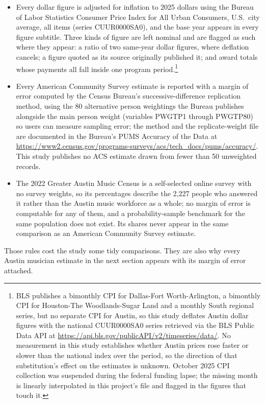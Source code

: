 \begin{itemize}
\item Every dollar figure is adjusted for inflation to 2025 dollars using the
      Bureau of Labor Statistics Consumer Price Index for All Urban Consumers,
      U.S.\ city average, all items (series CUUR0000SA0), and the base year
      appears in every figure subtitle. Three kinds of figure are left nominal
      and are flagged as such where they appear: a ratio of two same-year
      dollar figures, where deflation cancels; a figure quoted as its source
      originally published it; and award totals whose payments all fall inside
      one program period.\footnote{BLS publishes a bimonthly CPI for
      Dallas-Fort Worth-Arlington, a bimonthly CPI for Houston-The Woodlands-Sugar
      Land and a monthly South regional series, but no separate CPI for Austin,
      so this study deflates Austin dollar figures with the national CUUR0000SA0
      series retrieved via the BLS Public Data API at
      \url{https://api.bls.gov/publicAPI/v2/timeseries/data/}. No measurement
      in this study establishes whether Austin prices rose faster or slower
      than the national index over the period, so the direction of that
      substitution's effect on the estimates is unknown. October 2025 CPI
      collection was suspended during the federal funding lapse; the missing
      month is linearly interpolated in this project's file and flagged in the
      figures that touch it.}
\item Every American Community Survey estimate is reported with a margin of
      error computed by the Census Bureau's successive-difference replication
      method, using the 80 alternative person weightings the Bureau publishes
      alongside the main person weight (variables PWGTP1 through PWGTP80) so
      users can measure sampling error; the method and the replicate-weight
      file are documented in the Bureau's PUMS Accuracy of the Data at
      \url{https://www2.census.gov/programs-surveys/acs/tech_docs/pums/accuracy/}.
      This study publishes no ACS estimate drawn from fewer than 50 unweighted
      records.
\item The 2022 Greater Austin Music Census is a self-selected online survey
      with no survey weights, so its percentages describe the 2,227 people who
      answered it rather than the Austin music workforce as a whole; no margin
      of error is computable for any of them, and a probability-sample
      benchmark for the same population does not exist. Its shares never appear
      in the same comparison as an American Community Survey estimate.
\end{itemize}

Those rules cost the study some tidy comparisons. They are also why every
Austin musician estimate in the next section appears with its margin of error
attached.
